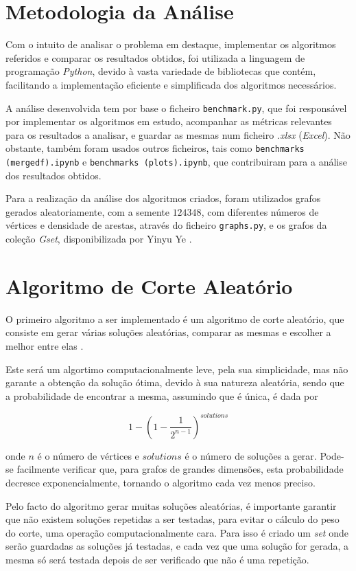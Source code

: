 \documentclass[mirror, portugues]{revdetua}
\begin{document}
\section{Metodologia da Análise}

Com o intuito de analisar o problema em destaque, implementar os algoritmos referidos e comparar os resultados obtidos, foi utilizada a linguagem de programação \textit{Python}, devido à vasta variedade de bibliotecas que contém, facilitando a implementação eficiente e simplificada dos algoritmos necessários.

A análise desenvolvida tem por base o ficheiro \texttt{benchmark.py}, que foi responsável por implementar os algoritmos em estudo, acompanhar as métricas relevantes para os resultados a analisar, e guardar as mesmas num ficheiro \textit{.xlsx} (\textit{Excel}). Não obstante, também foram usados outros ficheiros, tais como \texttt{benchmarks (mergedf).ipynb} e \texttt{benchmarks (plots).ipynb}, que contribuiram para a análise dos resultados obtidos.

Para a realização da análise dos algoritmos criados, foram utilizados grafos gerados aleatoriamente, com a semente $124348$, com diferentes números de vértices e densidade de arestas, através do ficheiro \texttt{graphs.py}, e os grafos da coleção \textit{Gset}, disponibilizada por Yinyu Ye \cite{GS24}.

\section{Algoritmo de Corte Aleatório}

O primeiro algoritmo a ser implementado é um algoritmo de corte aleatório, que consiste em gerar várias soluções aleatórias, comparar as mesmas e escolher a melhor entre elas \cite{AG14}.

Este será um algortimo computacionalmente leve, pela sua simplicidade, mas não garante a obtenção da solução ótima, devido à sua natureza aleatória, sendo que a probabilidade de encontrar a mesma, assumindo que é única, é dada por

$$1 - \left( 1 - \frac{1}{2^{n-1}} \right)^{solutions}$$

\noindent onde $n$ é o número de vértices e $solutions$ é o número de soluções a gerar. Pode-se facilmente verificar que, para grafos de grandes dimensões, esta probabilidade decresce exponencialmente, tornando o algoritmo cada vez menos preciso.

Pelo facto do algoritmo gerar muitas soluções aleatórias, é importante garantir que não existem soluções repetidas a ser testadas, para evitar o cálculo do peso do corte, uma operação computacionalmente cara. Para isso é criado um \textit{set} onde serão guardadas as soluções já testadas, e cada vez que uma solução for gerada, a mesma só será testada depois de ser verificado que não é uma repetição. 
\end{document}
